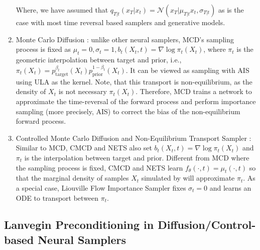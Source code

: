 \documentclass{article} %
\begin{document}
\begin{enumerate}[label=({{\arabic*}}), leftmargin=*]
Where, we have assumed that $q_{T|t}(x_T|x_t) =\mathcal{N}(x_T| \mu_{T|t}x_t, \sigma_{T|t})$ as is the case with most time reversal based samplers and generative models.





        \item Monte Carlo Diffusion \citep[MCD,][]{doucet2022score}: unlike other neural samplers, MCD's sampling process is fixed as $\mu_t = 0, \sigma_t = 1, b_t(X_t, t) = \nabla \log \pi_t(X_t)$, where $\pi_t$ is the geometric interpolation between target and prior, i.e., $\pi_t(X_t) = p_\text{target}^{\beta_t}(X_t)p_\text{prior}^{1-\beta_t}(X_t)$.
    It can be viewed as sampling with AIS using ULA as the kernel.
    Note, that this transport is non-equilibrium, as the density of $X_t$ is not necessary $\pi_t(X_t)$.
    Therefore, MCD trains a network to approximate the time-reversal of the forward process and perform importance sampling (more precisely, AIS) to correct the bias of the non-equilibrium forward process.
        \item Controlled Monte Carlo Diffusion \citep[CMCD,][]{vargas2024transport} and Non-Equilibrium Transport Sampler \citep[NETS,][]{mate2023learning,albergo2024nets}: 
        Similar to MCD, CMCD and NETS also set $b_t(X_t, t) = \nabla \log \pi_t(X_t)$ and $\pi_t$ is the interpolation between target and prior.
Different from MCD where the sampling process is fixed, CMCD and NETS learn $f_\theta(\cdot, t) = \mu_t(\cdot, t)$ so that the marginal density of samples $X_t$ simulated by  will approximate $\pi_t$.
As a special case, Liouville Flow Importance Sampler \citep[LFIS,][]{tian2024liouville} fixes $\sigma_t=0$ and learns an ODE to transport between $\pi_t$.

    
\end{enumerate}

\subsection{Lanvegin Preconditioning in Diffusion/Control-based Neural Samplers}
\label{appendix:langevin_precond}
\end{document}
